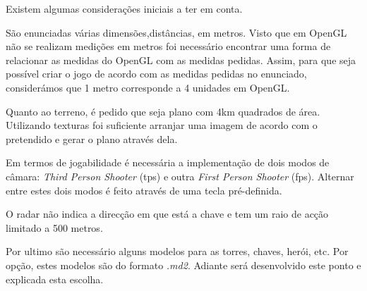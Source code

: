 % 

Existem algumas considerações iniciais a ter em conta.

São enunciadas várias dimensões,distâncias, em metros. Visto que em OpenGL não se realizam medições em metros foi necessário encontrar uma forma de relacionar as medidas do OpenGL com as medidas pedidas.
Assim, para que seja possível criar o jogo de acordo com as medidas pedidas no enunciado, considerámos que 1 metro corresponde a 4 unidades em OpenGL.

Quanto ao terreno, é pedido que seja plano com 4km quadrados de área. Utilizando texturas foi suficiente arranjar uma imagem de acordo com o pretendido e gerar o plano através dela.

Em termos de jogabilidade é necessária a implementação de dois modos de câmara: \textit{Third Person Shooter} (tps) e outra \textit{First Person Shooter} (fps).
Alternar entre estes dois modos é feito através de uma tecla pré-definida.

O radar não indica a direcção em que está a chave e tem um raio de acção limitado a 500 metros.

Por ultimo são necessário alguns modelos para as torres, chaves, herói, etc. Por opção, estes modelos são do formato \textit{.md2}. Adiante será desenvolvido este ponto e explicada esta escolha.
